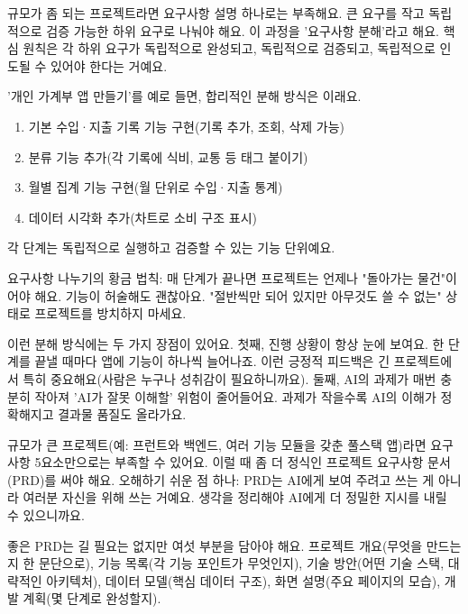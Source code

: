 규모가 좀 되는 프로젝트라면 요구사항 설명 하나로는 부족해요. 큰 요구를 작고 독립적으로 검증 가능한 하위 요구로 나눠야 해요. 이 과정을 '요구사항 분해'라고 해요. 핵심 원칙은 각 하위 요구가 독립적으로 완성되고, 독립적으로 검증되고, 독립적으로 인도될 수 있어야 한다는 거예요.

'개인 가계부 앱 만들기'를 예로 들면, 합리적인 분해 방식은 이래요.

\begin{enumerate}
  \item 기본 수입·지출 기록 기능 구현(기록 추가, 조회, 삭제 가능)
  \item 분류 기능 추가(각 기록에 식비, 교통 등 태그 붙이기)
  \item 월별 집계 기능 구현(월 단위로 수입·지출 통계)
  \item 데이터 시각화 추가(차트로 소비 구조 표시)
\end{enumerate}

각 단계는 독립적으로 실행하고 검증할 수 있는 기능 단위예요.

요구사항 나누기의 황금 법칙: 매 단계가 끝나면 프로젝트는 언제나 "돌아가는 물건"이어야 해요. 기능이 허술해도 괜찮아요. "절반씩만 되어 있지만 아무것도 쓸 수 없는" 상태로 프로젝트를 방치하지 마세요.

이런 분해 방식에는 두 가지 장점이 있어요. 첫째, 진행 상황이 항상 눈에 보여요. 한 단계를 끝낼 때마다 앱에 기능이 하나씩 늘어나죠. 이런 긍정적 피드백은 긴 프로젝트에서 특히 중요해요(사람은 누구나 성취감이 필요하니까요). 둘째, AI의 과제가 매번 충분히 작아져 'AI가 잘못 이해할' 위험이 줄어들어요. 과제가 작을수록 AI의 이해가 정확해지고 결과물 품질도 올라가요.


규모가 큰 프로젝트(예: 프런트와 백엔드, 여러 기능 모듈을 갖춘 풀스택 앱)라면 요구사항 5요소만으로는 부족할 수 있어요. 이럴 때 좀 더 정식인 프로젝트 요구사항 문서(PRD)를 써야 해요. 오해하기 쉬운 점 하나: PRD는 AI에게 보여 주려고 쓰는 게 아니라 여러분 자신을 위해 쓰는 거예요. 생각을 정리해야 AI에게 더 정밀한 지시를 내릴 수 있으니까요.

좋은 PRD는 길 필요는 없지만 여섯 부분을 담아야 해요. 프로젝트 개요(무엇을 만드는지 한 문단으로), 기능 목록(각 기능 포인트가 무엇인지), 기술 방안(어떤 기술 스택, 대략적인 아키텍처), 데이터 모델(핵심 데이터 구조), 화면 설명(주요 페이지의 모습), 개발 계획(몇 단계로 완성할지).


